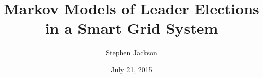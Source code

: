 \documentclass[12pt,oneside]{article}
\begin{document}
\title{Markov Models of Leader Elections in a Smart Grid System}
\author{Stephen Jackson}
\date{July 21, 2015}
\maketitle













\end{document}
